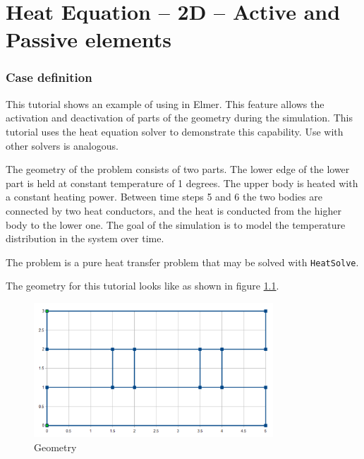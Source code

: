 \chapter{Heat Equation -- 2D -- Active and Passive elements}


\subsection*{Case definition}

This tutorial shows an example of using  in Elmer. This feature allows the activation and deactivation of parts of the geometry during the simulation. This tutorial uses the heat equation solver to demonstrate this capability. Use with other solvers is analogous.

The geometry of the problem consists of two parts. The lower edge of the lower part is held at constant temperature of 1 degrees. The upper body is heated with a constant heating power. Between time steps 5 and 6 the two bodies are connected by two heat conductors, and the heat is conducted from the higher body to the lower one. The goal of the simulation is to model the temperature distribution in the system over time. 

The problem is a pure heat transfer problem that may be solved with \texttt{HeatSolve}. 

The geometry for this tutorial looks like as shown in figure \ref{fg:geometry}.

\begin{figure}[H]
\centering
\includegraphics[width=0.8\textwidth]{geometry.png}
\caption{Geometry}\label{fg:geometry}
\end{figure}  

